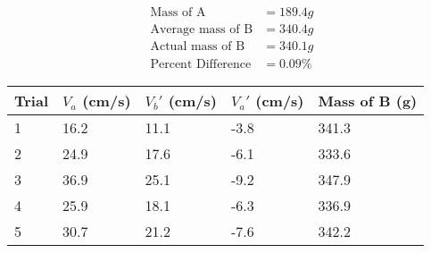 \begin{equation*}
    \begin{aligned}
        \text{Mass of A}&=189.4g \\
        \text{Average mass of B}&=340.4g \\
        \text{Actual mass of B}&=340.1g \\
        \text{Percent Difference}&=0.09\%
    \end{aligned}    
\end{equation*}
\begin{table}[H]
    \begin{tabular}{|l|l|l|l|l|}
    \hline
    Trial & $V_a$ (cm/s) & $V_b'$ (cm/s) & $V_a'$ (cm/s) & Mass of B (g) \\ \hline
    1     & 16.2        & 11.1        & -3.8         & 341.3         \\ \hline
    2     & 24.9        & 17.6        & -6.1         & 333.6         \\ \hline
    3     & 36.9        & 25.1        & -9.2         & 347.9         \\ \hline
    4     & 25.9        & 18.1        & -6.3         & 336.9         \\ \hline
    5     & 30.7        & 21.2        & -7.6         & 342.2         \\ \hline
    \end{tabular}
    \end{table}